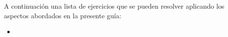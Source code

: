 A continuación una lista de ejercicios que se pueden resolver aplicando los aspectos abordados en la presente guía:

\begin{itemize}
	\item 
\end{itemize}